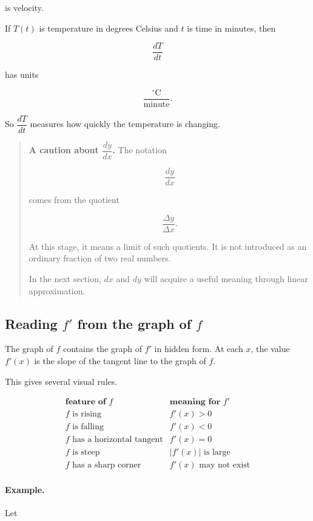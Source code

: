 is velocity.

If \(T(t)\) is temperature in degrees Celsius and \(t\) is time in minutes, then

\[
\frac{dT}{dt}
\]

has units

\[
\frac{^\circ\text{C}}{\text{minute}}.
\]

So \(\dfrac{dT}{dt}\) measures how quickly the temperature is changing.

\begin{quote}
\textbf{A caution about \(\dfrac{dy}{dx}\).}
The notation

\[
\frac{dy}{dx}
\]

comes from the quotient

\[
\frac{\Delta y}{\Delta x}.
\]

At this stage, it means a limit of such quotients.  It is not introduced as an ordinary fraction of two real numbers.

In the next section, \(dx\) and \(dy\) will acquire a useful meaning through linear approximation.
\end{quote}

\subsection{Reading \(f'\) from the graph of \(f\)}
\label{subsec:reading-derivative-from-function-graph}

The graph of \(f\) contains the graph of \(f'\) in hidden form.  At each \(x\), the value \(f'(x)\) is the slope of the tangent line to the graph of \(f\).

This gives several visual rules.

\[
\begin{array}{c|c}
\textbf{feature of }f & \textbf{meaning for }f' \\ \hline
f\text{ is rising} & f'(x)>0 \\[2pt]
f\text{ is falling} & f'(x)<0 \\[2pt]
f\text{ has a horizontal tangent} & f'(x)=0 \\[2pt]
f\text{ is steep} & |f'(x)|\text{ is large} \\[2pt]
f\text{ has a sharp corner} & f'(x)\text{ may not exist}
\end{array}
\]

\paragraph{Example.}
Let

